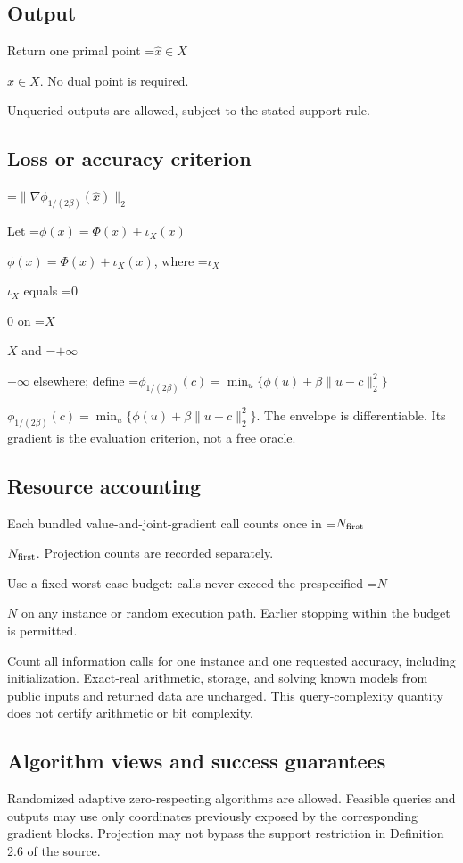\documentclass[10pt,a4paper]{article}
\newcommand{\AtlasMath}[1]{\par\begingroup\centering\setbox0=\hbox{$\displaystyle #1$}\ifdim\wd0>1.4\linewidth\typeout{ATLAS WIDE FORMULA: \the\wd0}\fi\ifdim\wd0>\linewidth\resizebox{\linewidth}{!}{\box0}\else\box0\fi\par\endgroup}
\newcommand{\AtlasInlineMath}[1]{\begingroup\setbox0=\hbox{$#1$}\ifdim\wd0>.4\linewidth\endgroup\AtlasMath{#1}\else\endgroup$#1$\fi}
\begin{document}
\subsection{Output}
Return one primal point \AtlasInlineMath{\widehat x\in X}. No dual point is required.

Unqueried outputs are allowed, subject to the stated support rule.

\subsection{Loss or accuracy criterion}

\AtlasMath{\|\nabla\phi_{1/(2\beta)}(\widehat{x})\|_2}


Let \AtlasInlineMath{\phi(x)=\Phi(x)+\iota_X(x)}, where \AtlasInlineMath{\iota_X} equals \AtlasInlineMath{0} on \AtlasInlineMath{X} and \AtlasInlineMath{+\infty} elsewhere; define \AtlasInlineMath{\phi_{1/(2\beta)}(c)=\min_u\{\phi(u)+\beta\|u-c\|_2^2\}}. The envelope is differentiable. Its gradient is the evaluation criterion, not a free oracle.

\subsection{Resource accounting}
Each bundled value-and-joint-gradient call counts once in \AtlasInlineMath{N_{\rm first}}. Projection counts are recorded separately.

Use a fixed worst-case budget: calls never exceed the prespecified \AtlasInlineMath{N} on any instance or random execution path. Earlier stopping within the budget is permitted.

Count all information calls for one instance and one requested accuracy, including initialization. Exact-real arithmetic, storage, and solving known models from public inputs and returned data are uncharged. This query-complexity quantity does not certify arithmetic or bit complexity.

\subsection{Algorithm views and success guarantees}
Randomized adaptive zero-respecting algorithms are allowed. Feasible queries and outputs may use only coordinates previously exposed by the corresponding gradient blocks. Projection may not bypass the support restriction in Definition 2.6 of the source.
\end{document}
